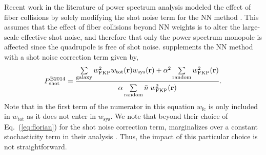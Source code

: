 
Recent work in the literature of power spectrum analysis modeled the effect of fiber collisions by solely modifying the shot noise term for the NN method \citep{Beutler:2014aa, Gil-Marin:2014aa}. 
This assumes that the effect of fiber collisions beyond NN weights is to alter the large-scale effective shot noise, and therefore that only the power spectrum monopole is affected since the quadrupole is free of shot noise. 
\cite{Beutler:2014aa} supplements the NN method with a shot noise correction term given by,
\begin{equation} \label{eq:florian}
P^\mathrm{B2014}_\mathrm{shot} = \frac{\sum\limits_{\mathrm{galaxy}} w^2_\mathrm{FKP}w_\mathrm{tot}({\bf r})w_\mathrm{sys}({\bf r}) + 
\alpha^2 \sum\limits_{\mathrm{random}} w_\mathrm{FKP}^2({\bf r})}
{\alpha \sum\limits_{\mathrm{random}}^{ } \bar{n} \; w_\mathrm{FKP}^2({\bf r})}.
\end{equation}
Note that in the first term of the numerator in this equation $w_\mathrm{fc}$ is only 
included in $w_\mathrm{tot}$ as it does not enter in $w_\mathrm{sys}$. 
We note that beyond their choice of Eq.~(\ref{eq:florian}) 
for the shot noise correction term, \cite{Beutler:2014aa} marginalizes over 
a constant stochasticity term in their analysis \citep[see Eq.~40 in][]{Beutler:2014aa}.
Thus, the impact of this particular choice is not straightforward. 


